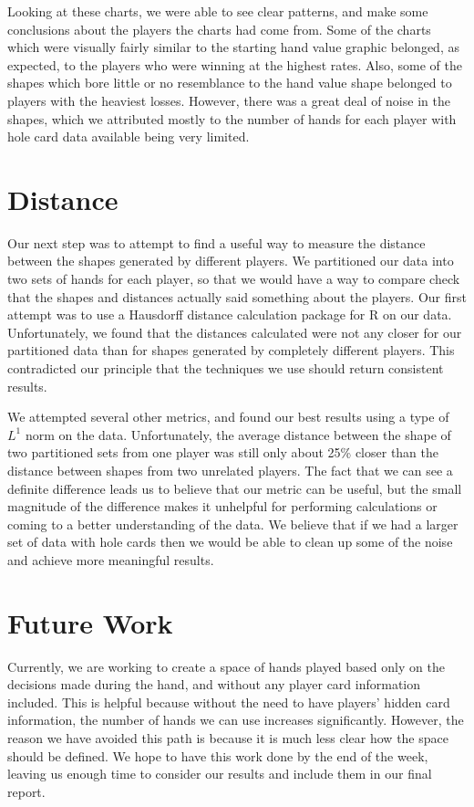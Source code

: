 \documentclass[11pt]{article}
\begin{document}
Looking at these charts, we were able to see clear patterns, and make some
conclusions about the players the charts had come from. Some of the charts which
were visually fairly similar to the starting hand value graphic belonged, as
expected, to the players who were winning at the highest rates. Also,
some of the shapes which bore little or no resemblance to the hand value shape
belonged to players with the heaviest losses. However, there was a great deal
of noise in the shapes, which we attributed mostly to the number of hands for each
player with hole card data available being very limited.

\section*{Distance}
Our next step was to attempt to find a useful way to measure the distance
between the shapes generated by different players. We partitioned our data into
two sets of hands for each player, so that we would have a way to compare check
that the shapes and distances actually said something about the players. Our
first attempt was to use a Hausdorff distance calculation package for R on our 
data. Unfortunately, we found that the distances calculated were not any closer
for our partitioned data than for shapes generated by completely different players.
This contradicted our principle that the techniques we use should return consistent
results.

We attempted several other metrics, and found our best results using a type of
$L^1$ norm on the data. Unfortunately, the average distance between the shape of
two partitioned sets from one player was still only about 25\% closer than the
distance between shapes from two unrelated players. The fact that we can see a
definite difference leads us to believe that our metric can be useful, but the
small magnitude of the difference makes it unhelpful for performing calculations
or coming to a better understanding of the data. We believe that if we had a larger
set of data with hole cards then we would be able to clean up some of the noise
and achieve more meaningful results.


\section*{Future Work}
Currently, we are working to create a space of hands played based only on the
decisions made during the hand, and without any player card information
included. This is helpful because without the need to have players' hidden card
information, the number of hands we can use increases significantly. However,
the reason we have avoided this path is because it is much less clear how the
space should be defined. We hope to have this work done by the end of the week,
leaving us enough time to consider our results and include them in our final
report.
\end{document}
